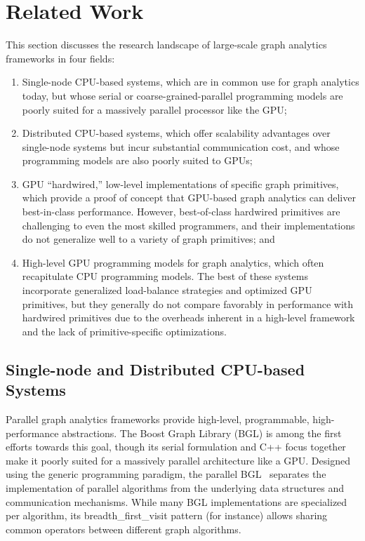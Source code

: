 \documentclass[format=acmsmall,review=false,screen=true]{acmart}
\begin{document}
\section{Related Work}
\label{sec:related}
This section discusses the research landscape of large-scale graph
analytics frameworks in four fields:
\begin{enumerate}
\item Single-node CPU-based systems, which are in common use for graph
  analytics today, but whose serial or coarse-grained-parallel
  programming models are poorly suited for a massively parallel
  processor like the GPU\@;
\item Distributed CPU-based systems, which offer scalability
  advantages over single-node systems but incur substantial
  communication cost, and whose programming models are also poorly
  suited to GPUs;
\item GPU ``hardwired,'' low-level implementations of specific graph
  primitives, which provide a proof of concept that GPU-based graph
  analytics can deliver best-in-class performance. However,
  best-of-class hardwired primitives are challenging to even the most
  skilled programmers, and their implementations do not generalize
  well to a variety of graph primitives; and
\item High-level GPU programming models for graph analytics, which
  often recapitulate CPU programming models. The best of these systems
  incorporate generalized load-balance strategies and optimized GPU
  primitives, but they generally do not compare favorably in
  performance with hardwired primitives due to the overheads inherent
  in a high-level framework and the lack of primitive-specific
  optimizations.
\end{enumerate}
\subsection{Single-node and Distributed CPU-based Systems}
\label{subsec:cpu}
Parallel graph analytics frameworks provide high-level, programmable,
high-performance abstractions. The Boost Graph Library (BGL) is among
the first efforts towards this goal, though its serial formulation and
C++ focus together make it poorly suited for a massively parallel
architecture like a GPU\@. Designed using the generic programming
paradigm, the parallel BGL~\cite{Gregor:2005:PBG} separates the
implementation of parallel algorithms from the underlying data
structures and communication mechanisms. While many BGL
implementations are specialized per algorithm, its
breadth\_first\_visit pattern (for instance) allows sharing common
operators between different graph algorithms.
\end{document}
